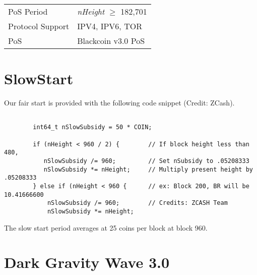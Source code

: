 \documentclass[11pt,a4paperpaper,]{report}
\begin{document}
\begin{longtable}[c]{@{}ll@{}}
\begin{minipage}[t]{0.35\columnwidth}\raggedright\strut
PoS Period
\strut\end{minipage} &
\begin{minipage}[t]{0.59\columnwidth}\raggedright\strut
\textit{nHeight} \(\geq\) 182,701
\strut\end{minipage}\tabularnewline
\begin{minipage}[t]{0.35\columnwidth}\raggedright\strut
Protocol Support
\strut\end{minipage} &
\begin{minipage}[t]{0.59\columnwidth}\raggedright\strut
IPV4, IPV6, TOR
\strut\end{minipage}\tabularnewline
\begin{minipage}[t]{0.35\columnwidth}\raggedright\strut
PoS
\strut\end{minipage} &
\begin{minipage}[t]{0.59\columnwidth}\raggedright\strut
Blackcoin v3.0 PoS
\strut\end{minipage}\tabularnewline
\bottomrule
\end{longtable}

\newpage

\section{SlowStart}\label{slowstart}

Our fair start is provided with the following code snippet (Credit:
ZCash).

\begin{verbatim}

        int64_t nSlowSubsidy = 50 * COIN;

        if (nHeight < 960 / 2) {        // If block height less than 480,
           nSlowSubsidy /= 960;         // Set nSubsidy to .05208333
           nSlowSubsidy *= nHeight;     // Multiply present height by .05208333
        } else if (nHeight < 960 {      // ex: Block 200, BR will be 10.41666600
            nSlowSubsidy /= 960;        // Credits: ZCASH Team
            nSlowSubsidy *= nHeight;
\end{verbatim}

The slow start period averages at 25 coins per block at block 960.

\section{Dark Gravity Wave 3.0}\label{dark-gravity-wave-3.0}
\end{document}

